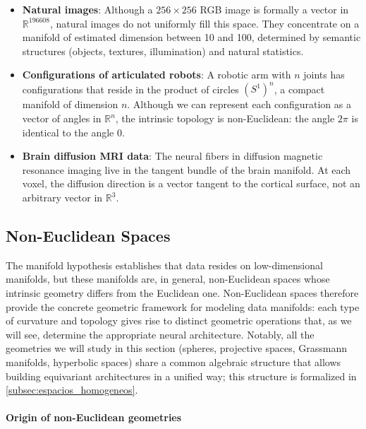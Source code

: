 \begin{itemize}
    \item \textbf{Natural images}: Although a $256 \times 256$ RGB image is formally a vector in $\mathbb{R}^{196608}$, natural images do not uniformly fill this space. They concentrate on a manifold of estimated dimension between 10 and 100, determined by semantic structures (objects, textures, illumination) and natural statistics.

    \item \textbf{Configurations of articulated robots}: A robotic arm with $n$ joints has configurations that reside in the product of circles $(S^1)^n$, a compact manifold of dimension $n$. Although we can represent each configuration as a vector of angles in $\mathbb{R}^n$, the intrinsic topology is non-Euclidean: the angle $2\pi$ is identical to the angle $0$.

    \item \textbf{Brain diffusion MRI data}: The neural fibers in diffusion magnetic resonance imaging live in the tangent bundle of the brain manifold. At each voxel, the diffusion direction is a vector tangent to the cortical surface, not an arbitrary vector in $\mathbb{R}^3$.
\end{itemize}

\subsection{Non-Euclidean Spaces}\label{subsec:espacios_no_euclidianos}

The manifold hypothesis establishes that data resides on low-dimensional manifolds, but these manifolds are, in general, non-Euclidean spaces whose intrinsic geometry differs from the Euclidean one. Non-Euclidean spaces therefore provide the concrete geometric framework for modeling data manifolds: each type of curvature and topology gives rise to distinct geometric operations that, as we will see, determine the appropriate neural architecture. Notably, all the geometries we will study in this section (spheres, projective spaces, Grassmann manifolds, hyperbolic spaces) share a common algebraic structure that allows building equivariant architectures in a unified way; this structure is formalized in \autoref{subsec:espacios_homogeneos}.

\paragraph{Origin of non-Euclidean geometries}

